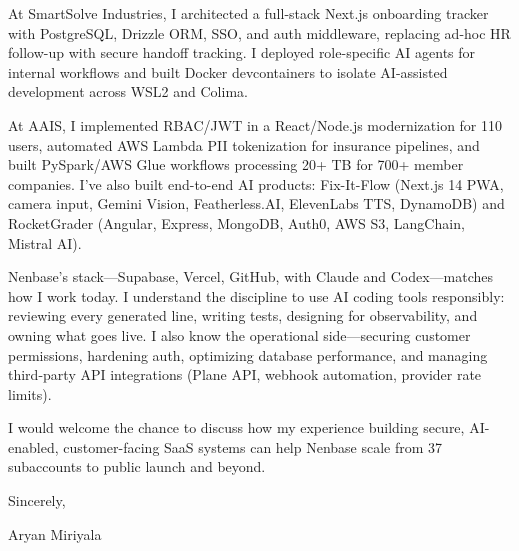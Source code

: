 \documentclass[letterpaper,11pt]{article}
\begin{document}
\vspace{6pt}

At SmartSolve Industries, I architected a full-stack Next.js onboarding tracker with PostgreSQL, Drizzle ORM, SSO, and auth middleware, replacing ad-hoc HR follow-up with secure handoff tracking. I deployed role-specific AI agents for internal workflows and built Docker devcontainers to isolate AI-assisted development across WSL2 and Colima.

\vspace{6pt}

At AAIS, I implemented RBAC/JWT in a React/Node.js modernization for 110 users, automated AWS Lambda PII tokenization for insurance pipelines, and built PySpark/AWS Glue workflows processing 20+ TB for 700+ member companies. I've also built end-to-end AI products: Fix-It-Flow (Next.js 14 PWA, camera input, Gemini Vision, Featherless.AI, ElevenLabs TTS, DynamoDB) and RocketGrader (Angular, Express, MongoDB, Auth0, AWS S3, LangChain, Mistral AI).

\vspace{6pt}

Nenbase's stack---Supabase, Vercel, GitHub, with Claude and Codex---matches how I work today. I understand the discipline to use AI coding tools responsibly: reviewing every generated line, writing tests, designing for observability, and owning what goes live. I also know the operational side---securing customer permissions, hardening auth, optimizing database performance, and managing third-party API integrations (Plane API, webhook automation, provider rate limits).

\vspace{6pt}

I would welcome the chance to discuss how my experience building secure, AI-enabled, customer-facing SaaS systems can help Nenbase scale from 37 subaccounts to public launch and beyond.

\vspace{14pt}

Sincerely,

\vspace{6pt}

Aryan Miriyala
\end{document}

